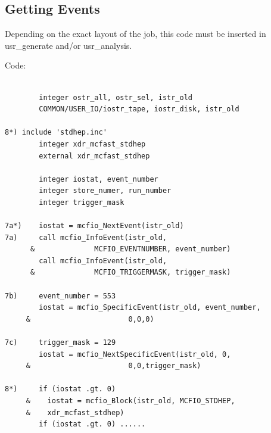 \subsection{Getting Events }
\vspace{.1in}

	Depending on the exact layout of the job, this code must be
inserted in usr\_generate and/or usr\_analysis.

\vspace{.1in}
 Code:
\begin{verbatim}

        integer ostr_all, ostr_sel, istr_old
        COMMON/USER_IO/iostr_tape, iostr_disk, istr_old

8*)	include 'stdhep.inc'
        integer xdr_mcfast_stdhep
        external xdr_mcfast_stdhep

        integer iostat, event_number
        integer store_numer, run_number
        integer trigger_mask

7a*)    iostat = mcfio_NextEvent(istr_old)
7a)     call mcfio_InfoEvent(istr_old,
      &              MCFIO_EVENTNUMBER, event_number)
        call mcfio_InfoEvent(istr_old,
      &              MCFIO_TRIGGERMASK, trigger_mask)

7b)     event_number = 553
        iostat = mcfio_SpecificEvent(istr_old, event_number,
     &                       0,0,0)

7c)     trigger_mask = 129
        iostat = mcfio_NextSpecificEvent(istr_old, 0,
     &                       0,0,trigger_mask)

8*)     if (iostat .gt. 0)
     &    iostat = mcfio_Block(istr_old, MCFIO_STDHEP,
     &    xdr_mcfast_stdhep)
        if (iostat .gt. 0) ......

\end{verbatim}
